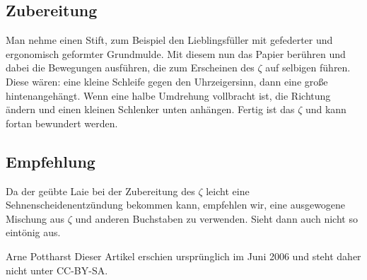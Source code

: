 {\subsection*{Zubereitung}
Man nehme einen Stift, zum Beispiel den Lieblingsfüller
mit gefederter und ergonomisch geformter Grundmulde.
Mit diesem nun das Papier berühren und dabei die Bewegungen
ausführen, die zum Erscheinen des $\zeta$ auf selbigen
führen. Diese wären: eine kleine Schleife gegen den Uhrzeigersinn,
dann eine große hintenangehängt. Wenn eine halbe
Umdrehung vollbracht ist, die Richtung ändern und einen kleinen Schlenker
unten anhängen. Fertig ist das $\zeta$ und kann fortan bewundert werden.

\subsection*{Empfehlung}
Da der geübte Laie bei der Zubereitung des $\zeta$ leicht eine
Sehnenscheidenentzündung bekommen kann, empfehlen wir, eine ausgewogene
Mischung aus $\zeta$ und anderen Buchstaben zu verwenden. Sieht dann auch nicht so
eintönig aus.}
{Arne Pottharst}\vfill
\small Dieser Artikel erschien ursprünglich im Juni 2006 und steht daher nicht unter
CC-BY-SA.
